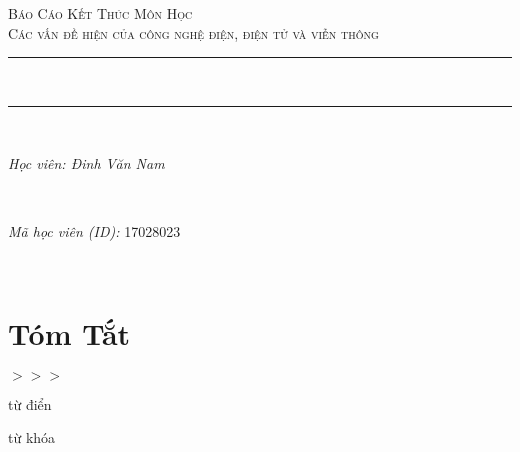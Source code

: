 \documentclass{article}
\date{\today}											%
\begin{document}
	

\begin{titlepage}
	\centering
	\vspace*{0.5 cm}
	\textsc{\LARGE Báo Cáo Kết Thúc Môn Học}\\[1.0 cm]	%
	\textsc{\Large Các vấn đề hiện  của công nghệ điện, điện tử và viễn thông}\\[0.5 cm]				%


	\rule{\linewidth}{0.2 mm} \\[0.4 cm]
	\rule{\linewidth}{0.2 mm} \\[1.5 cm]
	
	\begin{minipage}{0.5\textwidth}
		\begin{flushleft} \large
			\emph{Học viên: Đinh Văn Nam}\\
		\end{flushleft}
	\end{minipage}~
	\begin{minipage}{0.5\textwidth}
		\begin{flushright} \large
			\emph{Mã học viên (ID):} 17028023									%
		\end{flushright}
	\end{minipage}\\[2 cm]
	
	
	\vfill
	
\end{titlepage}
	
	\tableofcontents
	\pagebreak
	

\section*{Tóm Tắt}
	$>>>$
	
từ điển

từ khóa		
\end{document}
